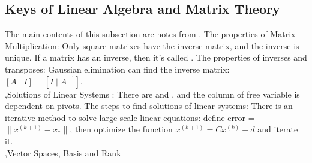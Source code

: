 \documentclass[10pt]{report}
\begin{document}
\subsection{Keys of Linear Algebra and Matrix Theory}

The main contents of this subsection are notes from \cite{deisenroth2020mathematics}.
The properties of Matrix Multiplication:
Only square matrixes have the inverse matrix, and the inverse is unique. If a matrix has an inverse, then it's called .
The properties of inverses and transposes:
Gaussian elimination can find the inverse matrix: $[A\mid I]=[I\mid A^{-1}]$.\\
\sep{Solutions of Linear Systems}
:
There are  and , and the column of free variable is dependent on pivots. The steps to find solutions of linear systems:
There is an iterative method to solve large-scale linear equations:
define error = $\|x^{(k+1)}-x_*\|$, then optimize the function $x^{(k+1)}=Cx^{(k)}+d$ and iterate it.\\
\sep{Vector Spaces, Basis and Rank}
\end{document}
